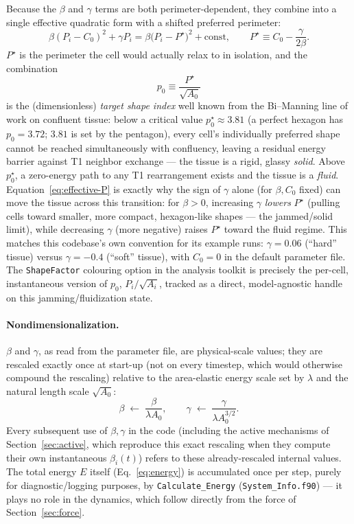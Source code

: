 \documentclass[11pt]{article}
\begin{document}
Because the $\beta$ and $\gamma$ terms are both perimeter-dependent, they combine into
a single effective quadratic form with a shifted preferred perimeter:
\begin{equation}
  \beta (P_i-C_0)^2 + \gamma P_i
  = \beta\Big(P_i - P^\star\Big)^2 + \text{const}, \qquad
  P^\star \equiv C_0 - \frac{\gamma}{2\beta}.
  \label{eq:effective-P}
\end{equation}
$P^\star$ is the perimeter the cell would actually relax to in isolation, and the
combination
\[
  p_0 \equiv \frac{P^\star}{\sqrt{A_0}}
\]
is the (dimensionless) \emph{target shape index} well known from the Bi--Manning line of
work on confluent tissue: below a critical value $p_0^\star \approx 3.81$ (a perfect
hexagon has $p_0=3.72$; $3.81$ is set by the pentagon), every cell's individually
preferred shape cannot be reached simultaneously with confluency, leaving a residual
energy barrier against T1 neighbor exchange --- the tissue is a rigid, glassy
\emph{solid}. Above $p_0^\star$, a zero-energy path to any T1 rearrangement exists and
the tissue is a \emph{fluid}. Equation~\eqref{eq:effective-P} is exactly why the sign of
$\gamma$ alone (for $\beta,C_0$ fixed) can move the tissue across this transition: for
$\beta>0$, increasing $\gamma$ \emph{lowers} $P^\star$ (pulling cells toward smaller,
more compact, hexagon-like shapes --- the jammed/solid limit), while decreasing $\gamma$
(more negative) raises $P^\star$ toward the fluid regime. This matches this codebase's
own convention for its example runs: $\gamma = 0.06$ (``hard'' tissue) versus
$\gamma=-0.4$ (``soft'' tissue), with $C_0=0$ in the default parameter file. The
\texttt{ShapeFactor} colouring option in the analysis toolkit is precisely the per-cell,
instantaneous version of $p_0$, $P_i/\sqrt{A_i}$, tracked as a direct, model-agnostic
handle on this jamming/fluidization state.

\paragraph{Nondimensionalization.} $\beta$ and $\gamma$, as read from the parameter
file, are physical-scale values; they are rescaled exactly once at start-up (not on
every timestep, which would otherwise compound the rescaling) relative to the
area-elastic energy scale set by $\lambda$ and the natural length scale
$\sqrt{A_0}$:
\begin{equation}
  \beta \;\leftarrow\; \frac{\beta}{\lambda A_0}, \qquad
  \gamma \;\leftarrow\; \frac{\gamma}{\lambda A_0^{3/2}}.
  \label{eq:nondim}
\end{equation}
Every subsequent use of $\beta,\gamma$ in the code (including the active mechanisms of
Section~\ref{sec:active}, which reproduce this exact rescaling when they compute their
own instantaneous $\beta_i(t)$) refers to these already-rescaled internal values. The
total energy $E$ itself (Eq.~\eqref{eq:energy}) is accumulated once per step, purely
for diagnostic/logging purposes, by \texttt{Calculate\_Energy}
(\texttt{System\_Info.f90}) --- it plays no role in the dynamics, which follow directly
from the force of Section~\ref{sec:force}.
\end{document}
